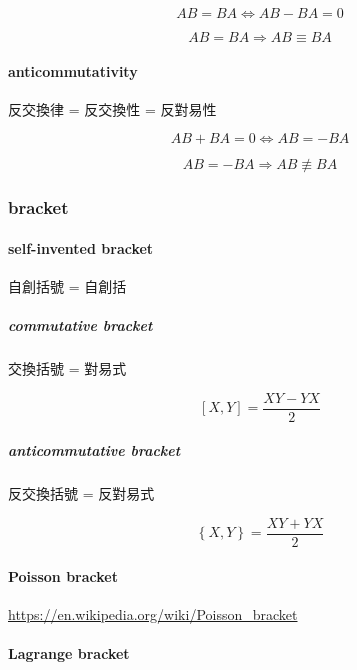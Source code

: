 \documentclass[
]{book}
\theoremstyle{definition}
\theoremstyle{definition}
\theoremstyle{definition}
\theoremstyle{definition}
\theoremstyle{remark}
\begin{document}
\[
AB=BA\Leftrightarrow AB-BA=0
\]

\[
AB=BA\Rightarrow AB\equiv BA
\]

\paragraph{anticommutativity}\label{anticommutativity}

\begin{CJK}{UTF8}{bsmi}
反交換律 = 反交換性 = 反對易性
\end{CJK}

\[
AB+BA=0\Leftrightarrow AB=-BA
\]

\[
AB=-BA\Rightarrow AB\not\equiv BA
\]

\subsubsection{bracket}\label{bracket}

\paragraph{self-invented bracket}\label{self-invented-bracket}

\begin{CJK}{UTF8}{bsmi}
自創括號 = 自創括
\end{CJK}

\subparagraph{commutative bracket}\label{commutative-bracket}

\begin{CJK}{UTF8}{bsmi}
交換括號 = 對易式
\end{CJK}

\[
\left[X,Y\right]=\dfrac{XY-YX}{2}
\]

\subparagraph{anticommutative bracket}\label{anticommutative-bracket}

\begin{CJK}{UTF8}{bsmi}
反交換括號 = 反對易式
\end{CJK}

\[
\left\{ X,Y\right\} =\dfrac{XY+YX}{2}
\]

\paragraph{Poisson bracket}\label{poisson-bracket}

\url{https://en.wikipedia.org/wiki/Poisson_bracket}

\paragraph{Lagrange bracket}\label{lagrange-bracket}
\end{document}
